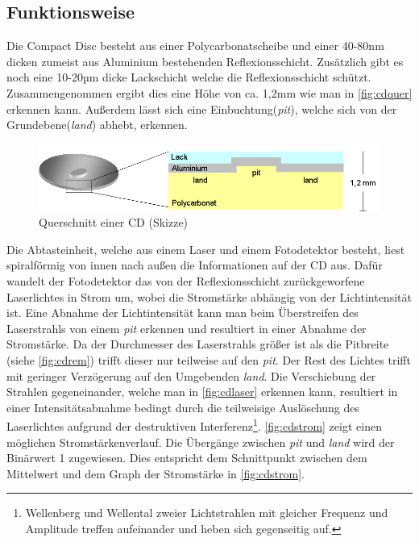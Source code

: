 \subsection{Funktionsweise}
\label{subsec:cdfunktionsweise}

Die Compact Disc besteht aus einer Polycarbonatscheibe und einer 40-80nm dicken
zumeist aus Aluminium bestehenden Reflexionsschicht. Zusätzlich gibt es noch
eine 10-20µm dicke Lackschicht welche die Reflexionsschicht schützt.
Zusammengenommen ergibt dies eine Höhe von ca. 1,2mm wie man in
\autoref{fig:cdquer} erkennen kann. Außerdem lässt sich eine
Einbuchtung(\textit{pit}), welche sich von der Grundebene(\textit{land}) abhebt,
erkennen. \cite{cfcd}

\begin{figure}[h]
  \begin{center}
      \begin{minipage}[t]{\textwidth}
        \begin{center}
            \includegraphics[height=0.1\textheight]{Bilder/Optische_Datentraeger_Die_Compact_Disc/Funktionsweise/cdquer.png}
            \caption[Querschnitt einer CD (Skizze) \newline \url{http://daten.didaktikchemie.uni-bayreuth.de/umat/cd_dvd/cd_dvd.htm} (zuletzt aufgerufen am 07.08.2015)]{Querschnitt einer CD (Skizze)}
            \label{fig:cdquer}
        \end{center}
      \end{minipage}
  \end{center}
\end{figure}

Die Abtasteinheit, welche aus einem Laser und einem Fotodetektor besteht, liest
spiralförmig von innen nach außen die Informationen auf der CD aus. Dafür
wandelt der Fotodetektor das von der Reflexionsschicht zurückgeworfene
Laserlichtes in Strom um, wobei die Stromstärke abhängig von der Lichtintensität
ist. Eine Abnahme der Lichtintensität kann man beim Überstreifen des
Laserstrahls von einem \textit{pit} erkennen und resultiert in einer Abnahme der
Stromstärke. Da der Durchmesser des Laserstrahls größer ist als die Pitbreite
(siehe \autoref{fig:cdrem}) trifft dieser nur teilweise auf den \textit{pit}.
Der Rest des Lichtes trifft mit geringer Verzögerung auf den Umgebenden
\textit{land}. Die Verschiebung der Strahlen gegeneinander, welche man in
\autoref{fig:cdlaser} erkennen kann, resultiert in einer Intensitätsabnahme
bedingt durch die teilweisige Auslöschung des Laserlichtes aufgrund der
destruktiven Interferenz\footnote{Wellenberg und Wellental zweier Lichtstrahlen
mit gleicher Frequenz und Amplitude treffen aufeinander und heben sich
gegenseitig auf.}. \autoref{fig:cdstrom} zeigt einen möglichen
Stromstärkenverlauf. Die Übergänge zwischen \textit{pit} und \textit{land} wird
der Binärwert 1 zugewiesen. Dies entspricht dem Schnittpunkt zwischen dem
Mittelwert und dem Graph der Stromstärke in \autoref{fig:cdstrom}. \cite{cdp}

